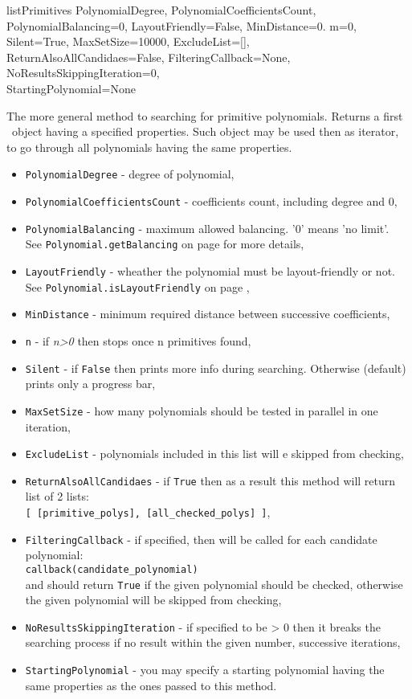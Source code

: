  {listPrimitives} {PolynomialDegree, PolynomialCoefficientsCount, PolynomialBalancing=0, LayoutFriendly=False, MinDistance=0. m=0, Silent=True, MaxSetSize=10000, ExcludeList=[], ReturnAlsoAllCandidaes=False, FilteringCallback=None, NoResultsSkippingIteration=0,\\StartingPolynomial=None} {
	The more general method to searching for primitive polynomials.
	Returns a first \Polynomial\ object having a specified properties. Such object may be used then as iterator, to go through all polynomials having the same properties.
	\begin{itemize}
		\item \texttt{PolynomialDegree} - degree of polynomial,
		\item \texttt{PolynomialCoefficientsCount} - coefficients count, including degree and 0,
		\item \texttt{PolynomialBalancing} - maximum allowed balancing. '0' means 'no limit'. \\See \texttt{Polynomial.getBalancing} on page \pageref{polynomial:getbalancing} for more details,
		\item \texttt{LayoutFriendly} - wheather the polynomial must be layout-friendly or not. \\See \texttt{Polynomial.isLayoutFriendly} on page \pageref{polynomial:islayoutfriendly},
		\item \texttt{MinDistance} - minimum required distance between successive coefficients,
		\item \texttt{n} - if \textit{n>0} then stops once n primitives found,
		\item \texttt{Silent} - if \texttt{False} then prints more info during searching. Otherwise (default) prints only a progress bar,
		\item \texttt{MaxSetSize} - how many polynomials should be tested in parallel in one iteration,
		\item \texttt{ExcludeList} - polynomials included in this list will e skipped from checking,
		\item \texttt{ReturnAlsoAllCandidaes} - if \texttt{True} then as a result this method will return list of 2 lists: \\\texttt{[ [primitive\_polys], [all\_checked\_polys] ]},
		\item \texttt{FilteringCallback} - if specified, then will be called for each candidate polynomial:\\\texttt{callback(candidate\_polynomial)}\\and should return \texttt{True} if the given polynomial should be checked, otherwise the given polynomial will be skipped from checking,
		\item \texttt{NoResultsSkippingIteration} - if specified to be > 0 then it breaks the searching process if no result within the given number, successive iterations,
		\item \texttt{StartingPolynomial} - you may specify a starting polynomial having the same properties as the ones passed to this method.
	\end{itemize}
}
